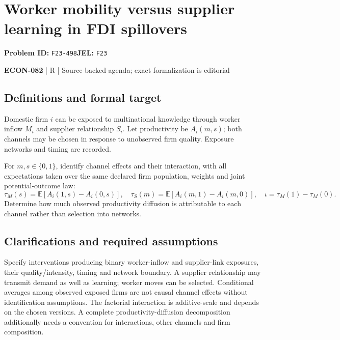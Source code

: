 \documentclass[11pt,a4paper]{article}
\begin{document}
\section*{Worker mobility versus supplier learning in FDI spillovers}
\textbf{Problem ID:} \texttt{F23-498}\quad \textbf{JEL:} \texttt{F23}\par
\label{problem:OP-0645}


\label{audited:ECON-082}

{\sffamily\small\color{muted}\textbf{ECON-082} | R | Source-backed agenda; exact formalization is editorial\par}

\subsection*{Definitions and formal target}

Domestic firm $i$ can be exposed to multinational knowledge through worker inflow $M_i$ and supplier relationship $S_i$. Let productivity be $A_i(m,s)$; both channels may be chosen in response to unobserved firm quality. Exposure networks and timing are recorded.

For $m,s\in\{0,1\}$, identify channel effects and their interaction, with all expectations taken over the same declared firm population, weights and joint potential-outcome law:
\[
 \tau_M(s)=\mathbb E[A_i(1,s)-A_i(0,s)],\quad
 \tau_S(m)=\mathbb E[A_i(m,1)-A_i(m,0)],\quad
 \iota=\tau_M(1)-\tau_M(0).
\]
Determine how much observed productivity diffusion is attributable to each channel rather than selection into networks.

\subsection*{Clarifications and required assumptions}

Specify interventions producing binary worker-inflow and supplier-link exposures, their quality/intensity, timing and network boundary. A supplier relationship may transmit demand as well as learning; worker moves can be selected. Conditional averages among observed exposed firms are not causal channel effects without identification assumptions. The factorial interaction is additive-scale and depends on the chosen versions. A complete productivity-diffusion decomposition additionally needs a convention for interactions, other channels and firm composition.
\end{document}
